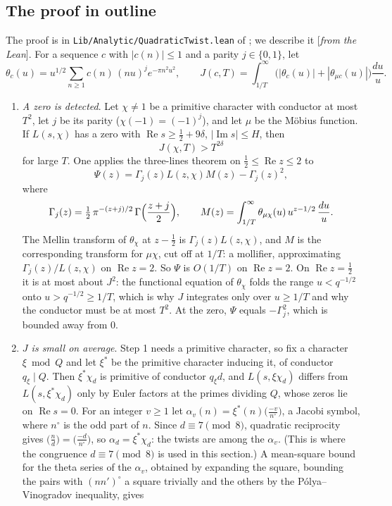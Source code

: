 \documentclass[11pt]{amsart}
\numberwithin{equation}{section}
\theoremstyle{definition}
\theoremstyle{remark}
\newcommand{\re}{\operatorname{Re}}
\newcommand{\im}{\operatorname{Im}}
\newcommand{\status}[1]{\textup{[\emph{#1}]}}
\begin{document}
\subsection*{The proof in outline}
The proof is in \texttt{Lib/Analytic/QuadraticTwist.lean} of \cite{short}; we describe it \status{from the Lean}. For a sequence $c$ with $|c(n)|\le1$ and a parity $j\in\{0,1\}$, let
\begin{equation}
 \theta_c(u)=u^{1/2}\sum_{n\ge1}c(n)\,(nu)^je^{-\pi n^2u^2},\qquad
 J(c,T)=\int_{1/T}^\infty\bigl(|\theta_c(u)|+|\theta_{\mu c}(u)|\bigr)\frac{du}u .
\end{equation}
\begin{enumerate}[leftmargin=2em]
\item \emph{A zero is detected}. Let $\chi\ne1$ be a primitive character with conductor at most $T^2$, let $j$ be its parity ($\chi(-1)=(-1)^j$), and let $\mu$ be the M\"obius function. If $L(s,\chi)$ has a zero with $\re s\ge\frac12+9\delta$, $|\im s|\le H$, then
\begin{equation}
 J(\chi,T)>T^{2\delta}
\end{equation}
for large $T$. One applies the three-lines theorem on $\frac12\le\re z\le2$ to
\begin{equation}
 \Psi(z)=\Gamma_j(z)L(z,\chi)M(z)-\Gamma_j(z)^2,
\end{equation}
where
\begin{equation}
 \Gamma_j(z)=\tfrac12\,\pi^{-(z+j)/2}\,\Gamma\Bigl(\frac{z+j}2\Bigr),\qquad M(z)=\int_{1/T}^\infty\theta_{\mu\chi}(u)\,u^{z-1/2}\,\frac{du}u .
\end{equation}
The Mellin transform of $\theta_\chi$ at $z-\frac12$ is $\Gamma_j(z)L(z,\chi)$, and $M$ is the corresponding transform for $\mu\chi$, cut off at $1/T$: a mollifier, approximating $\Gamma_j(z)/L(z,\chi)$ on $\re z=2$. So $\Psi$ is $O(1/T)$ on $\re z=2$. On $\re z=\frac12$ it is at most about $J^2$: the functional equation of $\theta_\chi$ folds the range $u<q^{-1/2}$ onto $u>q^{-1/2}\ge1/T$, which is why $J$ integrates only over $u\ge1/T$ and why the conductor must be at most $T^2$. At the zero, $\Psi$ equals $-\Gamma_j^2$, which is bounded away from $0$.
\item \emph{$J$ is small on average}. Step 1 needs a primitive character, so fix a character $\xi\bmod Q$ and let $\xi^*$ be the primitive character inducing it, of conductor $q_\xi\mid Q$. Then $\xi^*\chi_d$ is primitive of conductor $q_\xi d$, and $L(s,\xi\chi_d)$ differs from $L(s,\xi^*\chi_d)$ only by Euler factors at the primes dividing $Q$, whose zeros lie on $\re s=0$. For an integer $v\ge1$ let $\alpha_v(n)=\xi^*(n)\bigl(\frac{-v}{n^\circ}\bigr)$, a Jacobi symbol, where $n^\circ$ is the odd part of $n$. Since $d\equiv7\pmod8$, quadratic reciprocity gives $\bigl(\frac nd\bigr)=\bigl(\frac{-d}{n^\circ}\bigr)$, so $\alpha_d=\xi^*\chi_d$: the twists are among the $\alpha_v$. (This is where the congruence $d\equiv7\pmod8$ is used in this section.) A mean-square bound for the theta series of the $\alpha_v$, obtained by expanding the square, bounding the pairs with $(nn')^\circ$ a square trivially and the others by the P\'olya--Vinogradov inequality, gives

\end{enumerate}
\end{document}
